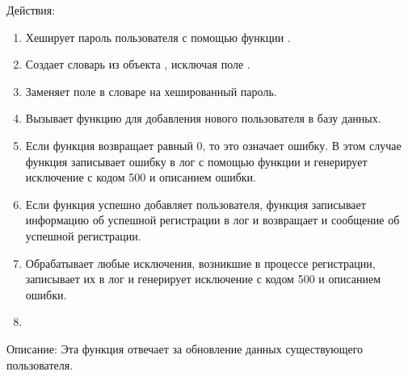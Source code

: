\documentclass[letterpaper,10pt,russian]{sphinxmanual}
\begin{document}
\sphinxAtStartPar
Действия:
\begin{enumerate}
%
\item {} 
\sphinxAtStartPar
Хеширует пароль пользователя с помощью функции .

\item {} 
\sphinxAtStartPar
Создает словарь  из объекта , исключая поле .

\item {} 
\sphinxAtStartPar
Заменяет поле  в словаре  на хешированный пароль.

\item {} 
\sphinxAtStartPar
Вызывает функцию  для добавления нового пользователя в базу данных.

\item {} 
\sphinxAtStartPar
Если функция  возвращает  равный 0, то это означает ошибку. В этом случае функция записывает ошибку в лог с помощью функции  и генерирует исключение  с кодом 500 и описанием ошибки.

\item {} 
\sphinxAtStartPar
Если функция  успешно добавляет пользователя, функция записывает информацию об успешной регистрации в лог и возвращает  и сообщение об успешной регистрации.

\item {} 
\sphinxAtStartPar
Обрабатывает любые исключения, возникшие в процессе регистрации, записывает их в лог и генерирует исключение  с кодом 500 и описанием ошибки.

\item {} 
\sphinxAtStartPar
{}

\end{enumerate}

\sphinxAtStartPar
Описание: Эта функция отвечает за обновление данных существующего пользователя.
\end{document}
